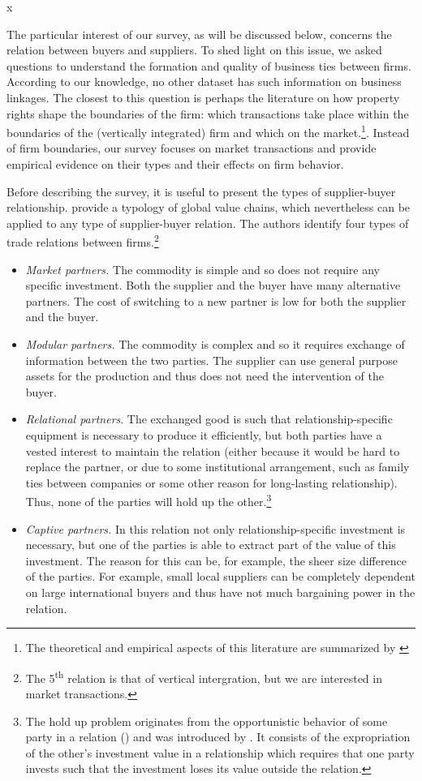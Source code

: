 x\documentclass[final, dvipsnames, authoryear,12pt]{elsarticle}
\begin{document}
The particular interest of our survey, as will be discussed below, concerns the relation between buyers and suppliers. To shed light on this issue, we asked questions to understand the formation and quality of business ties between firms. According to our knowledge, no other dataset has such information on business linkages. The closest to this question is perhaps the literature on how property rights shape the boundaries of the firm: which transactions take place within the boundaries of the (vertically integrated) firm and which on the market.\footnote{The theoretical and empirical aspects of this literature are summarized by \cite{antras2013grossman}}. Instead of firm boundaries, our survey focuses on market transactions and provide empirical evidence on their types and their effects on firm behavior.

Before describing the survey, it is useful to present the types of supplier-buyer relationship. \cite{gereffi2005governance} provide a typology of global value chains, which nevertheless can be applied to any type of supplier-buyer relation. The authors identify four types of trade relations between firms.\footnote{The 5\textsuperscript{th} relation is that of vertical intergration, but we are interested in market transactions.}

\begin{itemize}
    \item \emph{Market partners.} The commodity is simple and so does not require any specific investment. Both the supplier and the buyer have many alternative partners. The cost of switching to a new partner is low for both the supplier and the buyer.
    \item \emph{Modular partners.} The commodity is complex and so it requires exchange of information between the two parties. The supplier can use general purpose assets for the production and thus does not need the intervention of the buyer.
    \item \emph{Relational partners}. The exchanged good is such that relationship-specific equipment is necessary to produce it efficiently, but both parties have a vested interest to maintain the relation (either because it would be hard to replace the partner, or due to some institutional arrangement, such as family ties between companies or some other reason for long-lasting relationship). Thus, none of the parties will hold up the other.\footnote{The hold up problem originates from the opportunistic behavior of some party in a relation (\cite{williamson2007economic}) and was introduced by \cite{grossman1986costs}. It consists of the expropriation of the other's investment value in a relationship which requires that one party invests such that the investment loses its value outside the relation.}
    \item \emph{Captive partners.} In this relation not only relationship-specific investment is necessary, but one of the parties is able to extract part of the value of this investment. The reason for this can be, for example, the sheer size difference of the parties. For example, small local suppliers can be completely dependent on large international buyers and thus have not much bargaining power in the relation.
\end{itemize}
\end{document}
